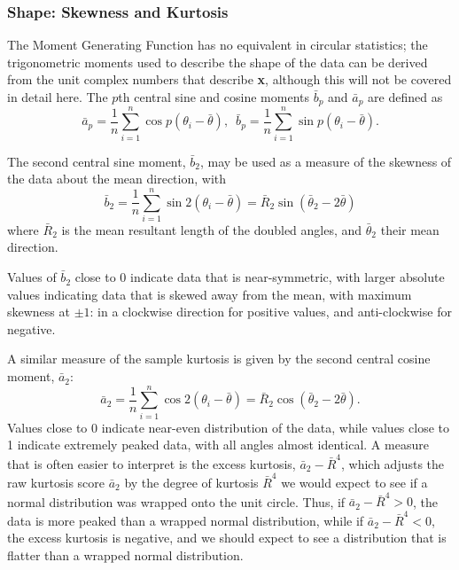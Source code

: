 \documentclass[../../ArchStats.tex]{subfiles}
\begin{document}


\subsubsection{Shape: Skewness and Kurtosis}
\label{sec:shape}

The Moment Generating Function has no equivalent in circular statistics; the trigonometric moments used to describe the shape of the data can be derived from the unit complex numbers that describe \textbf{x}, although this will not be covered in detail here. The $p$th central sine and cosine moments $\bar{b}_p$ and $\bar{a}_p$ are defined as 
	\begin{equation}
	\label{eq:trig-moments}
	\bar{a}_p = \frac{1}{n} \sum_{i=1}^n \cos p(\theta_i-\bar{\theta}), \, \, \, 
	\bar{b}_p = \frac{1}{n} \sum_{i=1}^n \sin p(\theta_i-\bar{\theta}).
	\end{equation}

The second central sine moment, $\bar{b}_2$, may be used as a measure of the skewness of the data about the mean direction, with
	\begin{equation}
	\label{eqn:bar-b-2}
	\bar{b}_2 = \frac{1}{n} \sum_{i=1}^n \sin 2(\theta_i-\bar{\theta}) = \bar{R}_2 \sin(\bar{\theta}_2 - 2\bar{\theta})
	\end{equation}
where $\bar{R}_2$ is the mean resultant length of the doubled angles, and $\bar{\theta}_2$ their mean direction. 

Values of $\bar{b}_2$ close to 0 indicate data that is near-symmetric, with larger  absolute values indicating data that is skewed away from the mean, with maximum skewness at $\pm1$: in a clockwise direction for positive values, and anti-clockwise for negative.

A similar measure of the sample kurtosis is given by the second central cosine moment, $\bar{a}_2$:
	\begin{equation}
 	\bar{a}_2 = \frac{1}{n} \sum_{i=1}^n \cos 2(\theta_i-\bar{\theta}) = \bar{R}_2 \cos(\bar{\theta}_2 - 2\bar{\theta}) .
 	\end{equation}
 Values close to 0 indicate near-even distribution of the data, while values close to 1 indicate extremely peaked data, with all angles almost identical. A measure that is often easier to interpret is the excess kurtosis, $\bar{a}_2 - \bar{R}^4$, which adjusts the raw kurtosis score $\bar{a}_2$ by the degree of kurtosis $\bar{R}^4$ we would expect to see if a normal distribution was wrapped onto the unit circle. Thus, if $\bar{a}_2 - \bar{R}^4 > 0$, the data is more peaked than a wrapped normal distribution, while if $\bar{a}_2 - \bar{R}^4 < 0$, the excess kurtosis is negative, and we should expect to see a distribution that is flatter than a wrapped normal distribution.
\end{document}
